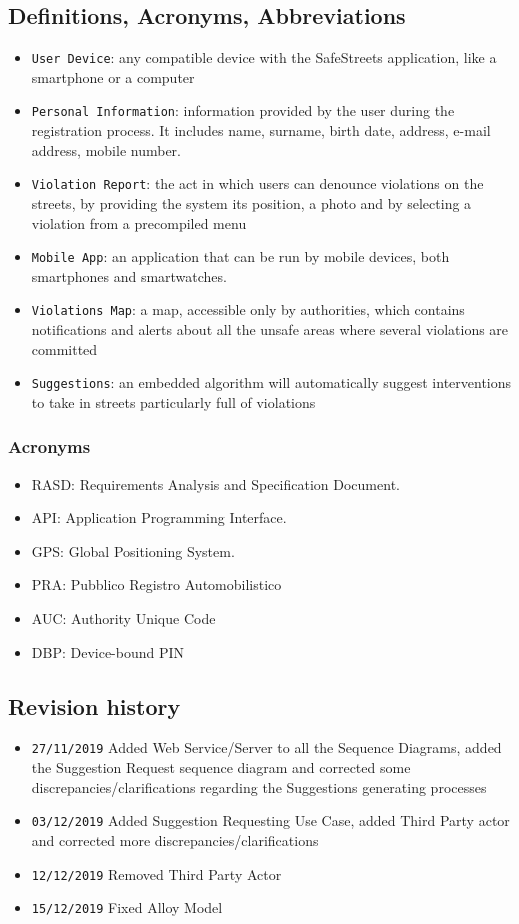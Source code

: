 \documentclass[12pt,a4paper]{article}
\begin{document}
\subsection{Definitions, Acronyms, Abbreviations}
			\begin{itemize}
				\item \texttt{User Device}: any compatible device with the SafeStreets application, like a smartphone or a computer
				\item \texttt{Personal Information}: information provided by the user during the registration process. It includes name, surname, birth date, address, e-mail address, mobile number.
				\item \texttt{Violation Report}: the act in which users can denounce violations on the streets, by providing the system its position, a photo and by selecting a violation from a precompiled menu
				\item \texttt{Mobile App}: an application that can be run by mobile devices, both smartphones and smartwatches.
				\item \texttt{Violations Map}: a map, accessible only by authorities, which contains notifications and alerts about all the unsafe areas where several violations are committed
				\item \texttt{Suggestions}: an embedded algorithm will automatically suggest interventions to take in streets particularly full of violations
			\end{itemize}
		\subsubsection{Acronyms}
			\begin{itemize}
				\item RASD: Requirements Analysis and Specification Document.
				\item API: Application Programming Interface.
				\item GPS: Global Positioning System.
				\item PRA: Pubblico Registro Automobilistico
				\item AUC: Authority Unique Code
				\item DBP: Device-bound PIN
			\end{itemize}
\newpage
\subsection{Revision history}
\begin{itemize}
\item \texttt{27/11/2019} Added Web Service/Server to all the Sequence Diagrams, added the Suggestion Request sequence diagram and corrected some discrepancies/clarifications regarding the Suggestions generating processes
\item \texttt{03/12/2019} Added Suggestion Requesting Use Case, added Third Party actor and corrected more discrepancies/clarifications
\item \texttt{12/12/2019} Removed Third Party Actor
\item \texttt{15/12/2019} Fixed Alloy Model
\end{itemize}
\end{document}
